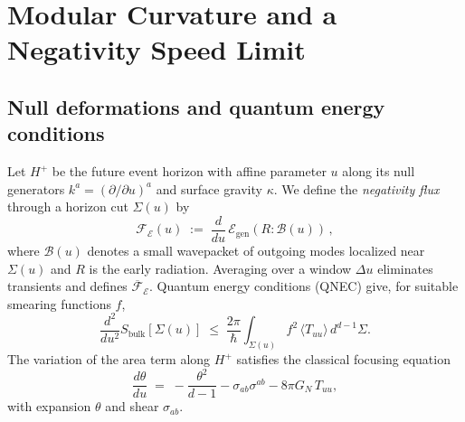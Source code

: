 \documentclass[11pt]{article}
\newcommand{\B}{\mathcal{B}}
\newcommand{\E}{\mathcal{E}}
\begin{document}
\section{Modular Curvature and a Negativity Speed Limit}
\subsection{Null deformations and quantum energy conditions}
Let $H^+$ be the future event horizon with affine parameter $u$ along its null generators $k^a=\left(\partial/\partial u\right)^a$ and surface gravity $\kappa$.
We define the \emph{negativity flux} through a horizon cut $\Sigma(u)$ by
\begin{equation}
  \mathcal{F}_{\E}(u) \;:=\; \frac{d}{du}\, \E_{\mathrm{gen}}(R:\B(u))\,,
\end{equation}
where $\B(u)$ denotes a small wavepacket of outgoing modes localized near $\Sigma(u)$ and $R$ is the early radiation.
Averaging over a window $\Delta u$ eliminates transients and defines $\overline{\mathcal{F}}_{\E}$.
Quantum energy conditions (QNEC) give, for suitable smearing functions $f$,
\begin{equation}
  \frac{d^2}{du^2} S_{\mathrm{bulk}}[\Sigma(u)] \;\le\; \frac{2\pi}{\hbar}\int_{\Sigma(u)}\! f^2 \, \langle T_{uu}\rangle \, d^{d-1}\Sigma.
  \label{eq:qnec}
\end{equation}
The variation of the area term along $H^+$ satisfies the classical focusing equation
\begin{equation}
  \frac{d\theta}{du} \;=\; -\frac{\theta^2}{d-1} - \sigma_{ab}\sigma^{ab} - 8\pi G_N\, T_{uu},
\end{equation}
with expansion $\theta$ and shear $\sigma_{ab}$.
\end{document}
